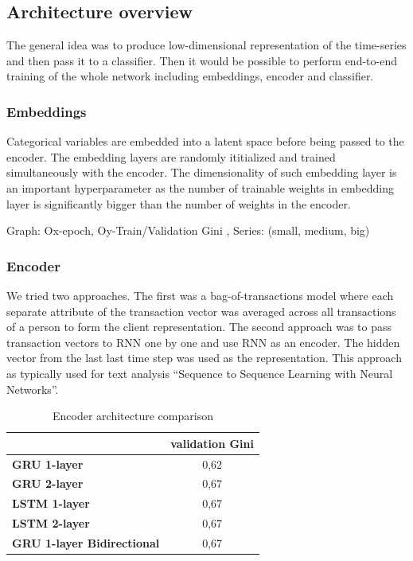 \documentclass{sigkddExp}
\begin{document}
\subsection{Architecture overview}
The general idea was to produce low-dimensional representation of the time-series and then pass it to a classifier. Then it would be possible to perform end-to-end training of the whole network including embeddings, encoder and classifier.

\subsubsection{Embeddings}

Categorical variables are embedded into a latent space before being passed to the encoder. The embedding layers are randomly ititialized and trained simultaneously with the encoder.
The dimensionality of such embedding layer is an important hyperparameter as the number of trainable weights in embedding layer is significantly bigger than the number of weights in the encoder.  

Graph: Ox-epoch, Oy-Train/Validation Gini , Series: (small, medium, big)

\subsubsection{Encoder}

We tried two approaches. The first was a bag-of-transactions model where each separate attribute of the transaction vector was averaged across all transactions of a person to form the client representation. The second approach was to pass transaction vectors to RNN one by one and use RNN as an encoder. The hidden vector from the last last time step was used as the representation. This approach as typically used for text analysis “Sequence to Sequence Learning with Neural Networks”\cite{NIPS2014_5346}.

\begin{table}
\caption{Encoder architecture comparison}
\begin{tabular}{ | l | c |  }
\hline
& \textbf{validation Gini} \\
\hline
\textbf{GRU 1-layer} & 0,62  \\
\textbf{GRU 2-layer} & 0,67  \\
\textbf{LSTM 1-layer} & 0,67  \\
\textbf{LSTM 2-layer} & 0,67  \\
\textbf{GRU 1-layer Bidirectional} & 0,67  \\
\hline
\end{tabular}
\label{tab3}
\end{table}
\end{document}
